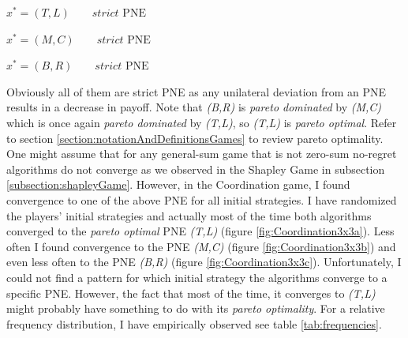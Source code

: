 \begin{description}\centering
    \item $x^{*} = (T,L) \qquad \textit{strict }\text{PNE}$
    \item $x^{*} = (M,C) \qquad \textit{strict }\text{PNE}$
    \item $x^{*} = (B,R) \qquad \textit{strict }\text{PNE}$
\end{description}

Obviously all of them are strict PNE as any unilateral deviation from an PNE results in a decrease in payoff. Note that \textit{(B,R)} is \textit{pareto dominated} by \textit{(M,C)} which is once again \textit{pareto dominated} by \textit{(T,L)}, so \textit{(T,L)} is \textit{pareto optimal}. Refer to section \ref{section:notationAndDefinitionsGames} to review pareto optimality. \\

One might assume that for any general-sum game that is not zero-sum no-regret algorithms do not converge as we observed in the Shapley Game in subsection \ref{subsection:shapleyGame}. However, in the Coordination game, I found convergence to one of the above PNE for all initial strategies. I have randomized the players' initial strategies and actually most of the time both algorithms converged to the \textit{pareto optimal} PNE \textit{(T,L)} (figure \ref{fig:Coordination3x3a}). Less often I found convergence to the PNE \textit{(M,C)} (figure \ref{fig:Coordination3x3b}) and even less often to the PNE \textit{(B,R)} (figure \ref{fig:Coordination3x3c}). Unfortunately, I could not find a pattern for which initial strategy the algorithms converge to a specific PNE. However, the fact that most of the time, it converges to \textit{(T,L)} might probably have something to do with its \textit{pareto optimality}. For a relative frequency distribution, I have empirically observed see table \ref{tab:frequencies}.

